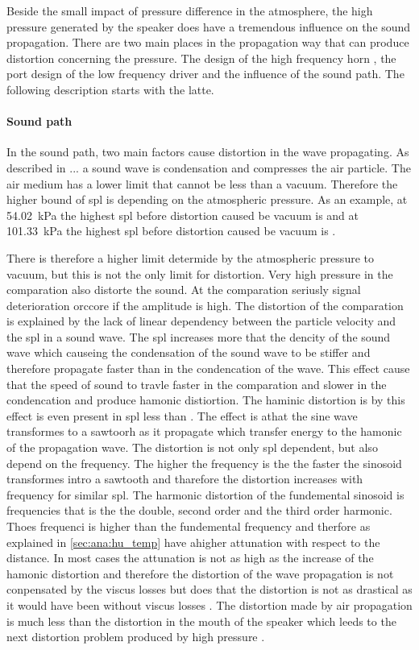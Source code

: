 Beside the small impact of pressure difference in the atmosphere, the high pressure generated by the speaker does have a tremendous influence on the sound propagation. There are two main places in the propagation way that can produce distortion concerning the pressure. The design of the high frequency horn \citep{czerwinski1999air}, the port design of the low frequency driver \citep{vanderkooy1998nonlinearities} and the influence of the sound path. The following description starts with the latte.

\paragraph{Sound path} In the sound path, two main factors cause distortion in the wave propagating. As described in ... a sound wave is condensation and compresses the air particle. The air medium has a lower limit that cannot be less than a vacuum. Therefore the higher bound of \gls{spl} is depending on the atmospheric pressure. As an example, at \SI{54.02}{\kilo\pascal} the highest \gls{spl} before distortion caused be vacuum is  and at \SI{101.33}{\kilo\pascal} the highest \gls{spl} before distortion caused be vacuum is . 

There is therefore a higher limit determide by the atmospheric pressure to vacuum, but this is not the only limit for distortion. Very high pressure in the comparation also distorte the sound. At the comparation seriusly signal deterioration orccore if the amplitude is high. The distortion of the comparation is explained by the lack of linear dependency between the particle velocity and the \gls{spl} in a sound wave. The \gls{spl} increases more that the dencity of the sound wave which causeing the condensation of the sound wave to be stiffer and therefore propagate faster than in the condencation of the wave. This effect cause that the speed of sound to travle faster in the comparation and slower in the condencation and produce hamonic distiortion. The haminic distortion is by this effect is even present in \gls{spl} less than  \citep{czerwinski1999air}.
The effect is athat the sine wave transformes to a sawtoorh as it propagate which transfer energy to the hamonic of the propagation wave. The distortion is not only \gls{spl} dependent, but also depend on the frequency. The higher the frequency is the the faster the sinosoid transformes intro a sawtooth and tharefore the distortion increases with frequency for similar \gls{spl}. The harmonic distortion of the fundemental sinosoid is frequencies that is the the double, second order and the third order harmonic. Thoes frequenci is higher than the fundemental frequency and therfore as explained in \autoref{sec:ana:hu_temp} have  ahigher attunation with respect to the distance. In most cases the attunation is not as high as the increase of the hamonic distortion and therefore the distortion of the wave propagation is not conpensated by the viscus losses but does that the distortion is not as drastical as it would have been without viscus losses \citep{czerwinski1999air}. The distortion made by air propagation is much less than the distortion in the mouth of the speaker which leeds to the next distortion problem produced by high pressure \citep{czerwinski1999air}.


